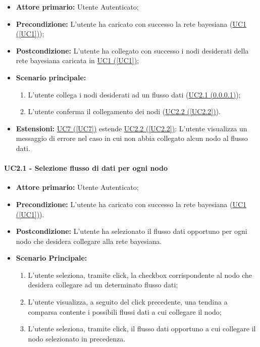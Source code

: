 \begin{itemize}
\item \textbf{Attore primario:} Utente Autenticato;
\item \textbf{Precondizione:} L'utente ha caricato con successo la rete bayesiana (\hyperref[UC1]{UC1 (\ref*{UC1})});
\item \textbf{Postcondizione:} L'utente ha collegato con successo i nodi desiderati della rete bayesiana caricata in \hyperref[UC1]{UC1 (\ref*{UC1})};
\item \textbf{Scenario principale:}
	\begin{enumerate}
	\item L'utente collega i nodi desiderati ad un flusso dati (\hyperref[UC2.1]{UC2.1 (\ref*{UC2.1})});
	\item L'utente conferma il collegamento dei nodi (\hyperref[2.2]{UC2.2 (\ref*{UC2.2})}).
	\end{enumerate}
\item \textbf{Estensioni:} \hyperref[UC7]{UC7 (\ref*{UC7})} estende \hyperref[UC2.2]{UC2.2 (\ref*{UC2.2})}: L'utente visualizza un messaggio di errore nel caso in cui non abbia collegato alcun nodo al flusso dati.
\end{itemize}

\paragraph{UC2.1 - Selezione flusso di dati per ogni nodo}\label{UC2.1}
\begin{itemize}
\item \textbf{Attore primario:} Utente Autenticato;
\item \textbf{Precondizione:} L'utente ha caricato con successo la rete bayesiana (\hyperref[UC1]{UC1 (\ref*{UC1})}).
\item \textbf{Postcondizione:} L'utente ha selezionato il flusso dati opportuno per ogni nodo che desidera collegare alla rete bayesiana.
\item \textbf{Scenario Principale:}
 \begin{enumerate}
 \item L'utente seleziona, tramite click, la checkbox corrispondente al nodo che desidera collegare ad un determinato flusso dati;
 \item L'utente visualizza, a seguito del click precedente, una tendina a comparsa contente i possibili flussi dati a cui collegare il nodo;
 \item L'utente seleziona, tramite click, il flusso dati opportuno a cui collegare il nodo selezionato in precedenza.
 \end{enumerate}
\end{itemize}


